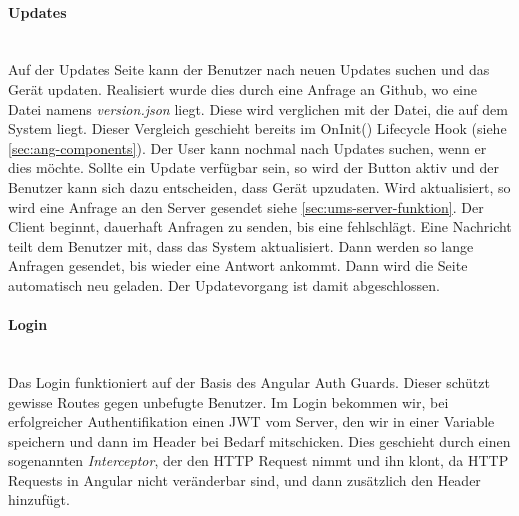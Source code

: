 \paragraph*{Updates}\mbox{}\\
Auf der Updates Seite kann der Benutzer nach neuen Updates suchen und das Gerät updaten. Realisiert wurde dies durch eine Anfrage an Github, wo eine Datei namens \textit{version.json} liegt. Diese wird verglichen mit der Datei, die auf dem System liegt. Dieser Vergleich geschieht bereits im OnInit() Lifecycle Hook (siehe \ref{sec:ang-components}). Der User kann nochmal nach Updates suchen, wenn er dies möchte. Sollte ein Update verfügbar sein, so wird der Button aktiv und der Benutzer kann sich dazu entscheiden, dass Gerät upzudaten. Wird aktualisiert, so wird eine Anfrage an den Server gesendet siehe \ref{sec:ums-server-funktion}. Der Client beginnt, dauerhaft Anfragen zu senden, bis eine fehlschlägt. Eine Nachricht teilt dem Benutzer mit, dass das System aktualisiert. Dann werden so lange Anfragen gesendet, bis wieder eine Antwort ankommt. Dann wird die Seite automatisch neu geladen. Der Updatevorgang ist damit abgeschlossen.

\paragraph*{Login}\mbox{}\\
Das Login funktioniert auf der Basis des Angular Auth Guards. Dieser schützt gewisse Routes gegen unbefugte Benutzer. Im Login bekommen wir, bei erfolgreicher Authentifikation einen \ac{JWT} vom Server, den wir in einer Variable speichern und dann im  Header bei Bedarf mitschicken. Dies geschieht durch einen sogenannten \textit{Interceptor}, der den \ac{HTTP} Request nimmt und ihn klont, da \ac{HTTP} Requests in Angular nicht veränderbar sind, und dann zusätzlich den  Header hinzufügt.

